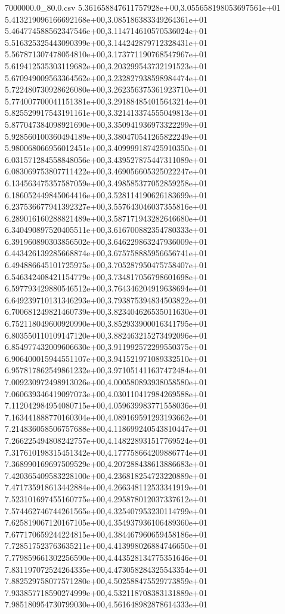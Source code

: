\begin{filecontents*}{7000000.0_80.0.csv}
5.361658847611757928e+00,3.055658198053697561e+01
5.413219096166692168e+00,3.085186383349264361e+01
5.464774588562347546e+00,3.114714610570536024e+01
5.516325325443090399e+00,3.144242879712328431e+01
5.567871307478054810e+00,3.173771190768547967e+01
5.619412535303119682e+00,3.203299543732191523e+01
5.670949009563364562e+00,3.232827938598984474e+01
5.722480730928626080e+00,3.262356375361923710e+01
5.774007700041151381e+00,3.291884854015643214e+01
5.825529917543191161e+00,3.321413374555049813e+01
5.877047384098921690e+00,3.350941936973322299e+01
5.928560100360494189e+00,3.380470541265822249e+01
5.980068066956012451e+00,3.409999187425910350e+01
6.031571284558848056e+00,3.439527875447311089e+01
6.083069753807711422e+00,3.469056605325022247e+01
6.134563475357587059e+00,3.498585377052859258e+01
6.186052449845064416e+00,3.528114190626183699e+01
6.237536677941392327e+00,3.557643046037355816e+01
6.289016160288821489e+00,3.587171943282646680e+01
6.340490897520405511e+00,3.616700882354780333e+01
6.391960890303856502e+00,3.646229863247936009e+01
6.443426139285668874e+00,3.675758885956656741e+01
6.494886645101725975e+00,3.705287950475758407e+01
6.546342408421154779e+00,3.734817056798601698e+01
6.597793429880546512e+00,3.764346204919638694e+01
6.649239710131346293e+00,3.793875394834503822e+01
6.700681249821460739e+00,3.823404626535011630e+01
6.752118049600920990e+00,3.852933900016341795e+01
6.803550110109147120e+00,3.882463215273492096e+01
6.854977432009606630e+00,3.911992572299550375e+01
6.906400015944551107e+00,3.941521971089332510e+01
6.957817862549861232e+00,3.971051411637472484e+01
7.009230972498913026e+00,4.000580893938058580e+01
7.060639346419097073e+00,4.030110417984269588e+01
7.112042984954080715e+00,4.059639983771558036e+01
7.163441888770160304e+00,4.089169591293193662e+01
7.214836058506757688e+00,4.118699240543810447e+01
7.266225494808242757e+00,4.148228931517769524e+01
7.317610198315451342e+00,4.177758664209886774e+01
7.368990169697509529e+00,4.207288438613886683e+01
7.420365409583228100e+00,4.236818254723220889e+01
7.471735918613442884e+00,4.266348112533341919e+01
7.523101697455160775e+00,4.295878012037337612e+01
7.574462746744261565e+00,4.325407953230114799e+01
7.625819067120167105e+00,4.354937936106489360e+01
7.677170659244224815e+00,4.384467960659458186e+01
7.728517523763635211e+00,4.413998026884746650e+01
7.779859661302256590e+00,4.443528134775351646e+01
7.831197072524264335e+00,4.473058284325543354e+01
7.882529758077571280e+00,4.502588475529773859e+01
7.933857718590274999e+00,4.532118708383131889e+01
7.985180954730799030e+00,4.561648982878614333e+01

\end{filecontents*}
